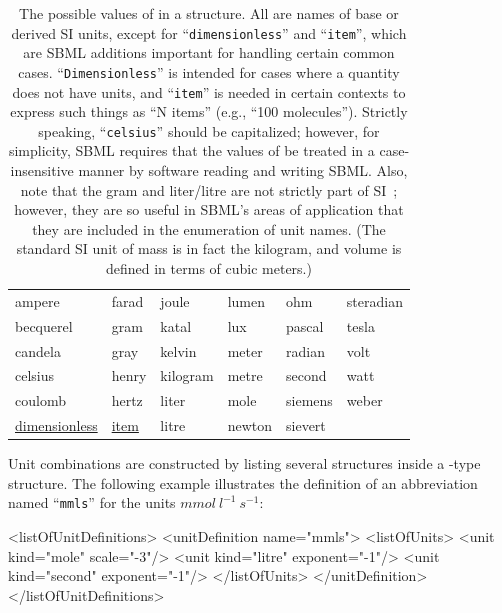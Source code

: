 \documentclass[10pt]{cekarticle}
\begin{document}
\begin{table}[thb]
  \centering
  \ttfamily
  \begin{tabular}{llllll}
    \toprule
    ampere      & farad	& joule		& lumen		& ohm     & steradian\\
    becquerel   & gram	& katal		& lux		& pascal  & tesla\\
    candela	& gray	& kelvin	& meter		& radian  & volt\\
    celsius     & henry	& kilogram	& metre		& second  & watt\\
    coulomb	& hertz	& liter		& mole		& siemens & weber\\
    \underline{dimensionless} & \underline{item} & litre	& newton	& sievert\\
    \bottomrule
  \end{tabular}
  \caption{The possible values of  in a 
    structure.  All are names of base or derived SI units, except for
    ``\texttt{dimensionless}'' and ``\texttt{item}'', which are 
    SBML additions important for handling certain common cases.
    ``\texttt{Dimensionless}'' is intended for cases where a quantity does not
    have units, and ``\texttt{item}'' is  needed in certain contexts to express
    such things as ``N items'' (e.g., ``100 molecules'').
    Strictly speaking, ``\texttt{celsius}'' should be capitalized; however,
    for simplicity, SBML requires that the values of  be
    treated in a case-insensitive manner by software reading and writing SBML.
    Also, note that the gram and liter/litre are not
    strictly part of SI~\protect\citep{taylor:1995}; however, they are so
    useful in SBML's areas of application that they are included in the
     enumeration of unit names.  (The standard SI unit of
    mass is in fact the kilogram, and volume is
    defined in terms of cubic meters.)}
  \label{tab:unitkind}
\end{table}

Unit combinations are constructed by listing several 
structures inside a -type structure.  The following
example illustrates the definition of an abbreviation named
``\texttt{mmls}'' for the units $mmol\ l^{-1}\ s^{-1}$:

\begin{example}
<listOfUnitDefinitions>
    <unitDefinition name="mmls">
        <listOfUnits>
            <unit kind="mole"   scale="-3"/>
            <unit kind="litre"  exponent="-1"/>
            <unit kind="second" exponent="-1"/>
        </listOfUnits>                
    </unitDefinition>
</listOfUnitDefinitions>
\end{example}
\end{document}
